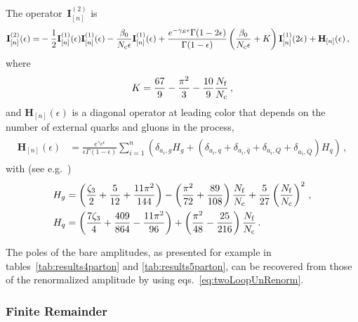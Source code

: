 The operator~$\mathbf{I}^{(2)}_{[n]}$ is
\begin{align}
  \label{eqn:Iop}
  \begin{split} 
    \mathbf{I}^{(2)}_{[n]}(\epsilon)=&
    -\frac{1}{2}\mathbf{I}^{(1)}_{[n]}(\epsilon)\mathbf{I}^{(1)}_{[n]}(\epsilon)
    -\frac{\beta_0}{N_\mathrm{c}\epsilon}\mathbf{I}^{(1)}_{[n]}(\epsilon) + 
    \frac{e^{-\gamma_E\epsilon}\Gamma(1-2\epsilon)}
    {\Gamma(1-\epsilon)}
    \left(\frac{\beta_0}{N_\mathrm{c}\epsilon}+K\right)
    \mathbf{I}^{(1)}_{[n]}(2\epsilon) + 
    \mathbf{H}_{[n]}(\epsilon)\,,
  \end{split}
\end{align}
where 
\begin{equation}
K=\frac{67}{9}-\frac{\pi ^2}{3}-\frac{10}{9}\frac{N_\mathrm{f}}{N_\mathrm{c}}\,,
\end{equation}
and $\mathbf{H}_{[n]}(\epsilon)$ is a diagonal operator at 
leading color that depends on the number of external quarks 
and gluons in the process,
\begin{align}
  \begin{split}
    \mathbf{H}_{[n]}(\epsilon)&=
    \frac{e^{\gamma_E\epsilon}}{\epsilon\Gamma(1-\epsilon)}
    \sum_{i=1}^n\left(
    \delta_{a_i,g}H_g+
    (\delta_{a_i,q}+\delta_{a_i,\bar q}
    +\delta_{a_i,Q}+\delta_{a_i,\bar Q})
    H_q
    \right)\,,
  \end{split}
\end{align}
with (see e.g.\ \cite{Bern:2003ck})
\begin{align}
  \begin{split}
    H_g&= \left(\frac{\zeta_3}{2}+\frac{5}{12}+
    \frac{11\pi^2}{144}\right)
    -\left(\frac{\pi^2}{72}+\frac{89}{108}\right)\frac{N_\mathrm{f}}{N_\mathrm{c}}
    +\frac{5}{27}\left(\frac{N_\mathrm{f}}{N_\mathrm{c}}\right)^2\,,\\
    H_q&=
    \left(\frac{7\zeta_3}{4}+\frac{409}{864}
    -\frac{11\pi^2}{96}\right)
    +\left(\frac{\pi^2}{48}-\frac{25}{216}\right)\frac{N_\mathrm{f}}{N_\mathrm{c}}\,.
  \end{split}
\end{align}

The poles of the bare amplitudes, as presented for example in
tables~\ref{tab:results4parton} and \ref{tab:results5parton}, can be recovered
from those of the renormalized amplitude by using
eqs.~\eqref{eq:twoLoopUnRenorm}.

\subsubsection{Finite Remainder}\label{sec:remainders}

